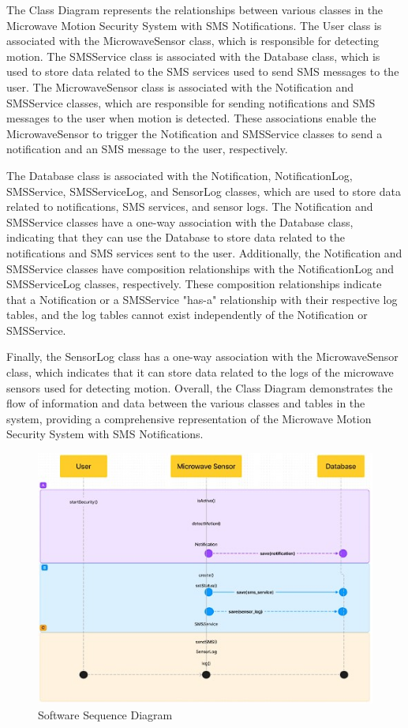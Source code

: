 \documentclass[conference]{IEEEtran}
\begin{document}
The Class Diagram represents the relationships between various classes in the
Microwave Motion Security System with SMS Notifications. The User class is associated
with the MicrowaveSensor class, which is responsible for detecting motion.
The SMSService class is associated with the Database class, which is used to store
data related to the SMS services used to send SMS messages to the user.
The MicrowaveSensor class is associated with the Notification and SMSService classes,
which are responsible for sending notifications and SMS messages to the user when
motion is detected. These associations enable the MicrowaveSensor to trigger the
Notification and SMSService classes to send a notification and an SMS message
to the user, respectively.

The Database class is associated with the Notification, NotificationLog, SMSService,
SMSServiceLog, and SensorLog classes, which are used to store data related to
notifications, SMS services, and sensor logs. The Notification and SMSService
classes have a one-way association with the Database class, indicating that they
can use the Database to store data related to the notifications and SMS services
sent to the user. Additionally, the Notification and SMSService classes have
composition relationships with the NotificationLog and SMSServiceLog classes, respectively.
These composition relationships indicate that a Notification or a SMSService "has-a"
relationship with their respective log tables, and the log tables cannot exist
independently of the Notification or SMSService.

Finally, the SensorLog class has a one-way association with the MicrowaveSensor class,
which indicates that it can store data related to the logs of the microwave sensors
used for detecting motion. Overall, the Class Diagram demonstrates the flow of
information and data between the various classes and tables in the system, providing a
comprehensive representation of the Microwave Motion Security System with
SMS Notifications.

\begin{figure}[htbp]
      \centering
      \includegraphics[width=0.8\linewidth]{softwareSeqDiagram.jpg}
      \caption{Software Sequence Diagram}
      \label{fig:softwareSeqDiagram}
\end{figure}
\end{document}
